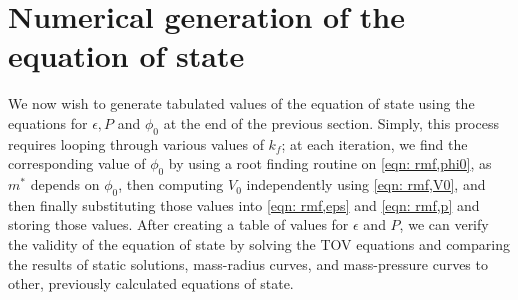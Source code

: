 \section{Numerical generation of the equation of state}


We now wish to generate tabulated values of the equation of state using the equations for $\epsilon, P$ and $\phi_0$ at the end of the previous section. Simply, this process requires looping through various values of $k_f$; at each iteration, we find the corresponding value of $\phi_0$ by using a root finding routine on \eqref{eqn: rmf,phi0}, as $m^*$ depends on $\phi_0$, then computing $V_0$ independently using \eqref{eqn: rmf,V0}, and then finally substituting those values into \eqref{eqn: rmf,eps} and \eqref{eqn: rmf,p} and storing those values. After creating a table of values for $\epsilon$ and $P$, we can verify the validity of the equation of state by solving the TOV equations and comparing the results of static solutions, mass-radius curves, and mass-pressure curves to other, previously calculated equations of state.

